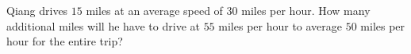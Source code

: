Qiang drives $15$ miles at an average speed of $30$ miles per hour. How many additional miles will he have to drive at $55$ miles per hour to average $50$ miles per hour for the entire trip?
